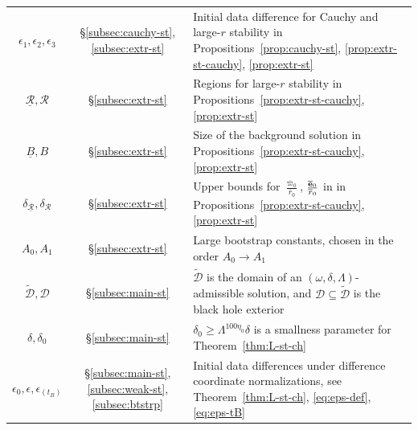 \documentclass[10pt, reqno]{amsart}
\theoremstyle{definition}
\theoremstyle{remark}
\theoremstyle{conjecture}
\numberwithin{equation}{section}
\newcommand{\0}{\emptyset}
\newcommand{\dlt}{\delta}
\newcommand{\eps}{\epsilon}
\newcommand{\Lmb}{\Lambda}
\newcommand{\omg}{\omega}
\newcommand{\bfe}{{\bf e}}
\newcommand{\calD}{\mathcal D}
\newcommand{\calR}{\mathcal R}
\newcommand{\f}{\frac}
\newcommand{\e}{\bfe}							%
\newcommand{\rbg}{\overline{r}}					%
\newcommand{\varpibg}{\overline{\varpi}}				%
\newcommand{\ebg}{\overline{\e}}					%
\begin{document}
\begin{center}
\begin{tabular}{c  c p{25em}}
$\eps_{1}, \eps_{2}, \eps_{3}$ & \S \ref{subsec:cauchy-st}, \ref{subsec:extr-st} & Initial data difference for Cauchy and large-$r$ stability in Propositions~\ref{prop:cauchy-st}, \ref{prop:extr-st-cauchy}, \ref{prop:extr-st} \\
$\underline{\calR}, \calR$ & \S \ref{subsec:extr-st} & Regions for large-$r$ stability in Propositions~\ref{prop:extr-st-cauchy}, \ref{prop:extr-st} \\
$\underline{B}, B$ & \S \ref{subsec:extr-st} & Size of the background solution in Propositions~\ref{prop:extr-st-cauchy}, \ref{prop:extr-st} \\
$\dlt_{\underline{\calR}}, \dlt_{\calR}$ & \S \ref{subsec:extr-st} & Upper bounds for $\f{\varpibg_0}{\rbg_0}$, $\f{\ebg_0}{\rbg_0}$ in in Propositions~\ref{prop:extr-st-cauchy}, \ref{prop:extr-st}\\
$A_{0}, A_{1}$ & \S \ref{subsec:extr-st} & Large bootstrap constants, chosen in the order $A_{0} \to A_{1}$ \\
$\widetilde{\calD}, \calD$ & \S \ref{subsec:main-st} & $\widetilde{\calD}$ is the domain of an $(\omg, \dlt, \Lmb)$-admissible solution, and $\calD \subseteq \widetilde{\calD}$ is the black hole exterior \\
$\dlt, \dlt_{0}$ & \S \ref{subsec:main-st} & $\dlt_{0}\geq \Lmb^{100\eta_0}\dlt$ is a smallness parameter for Theorem~\ref{thm:L-st-ch} \\
$\eps_{0}, \eps, \eps_{(t_B)}$ & \S \ref{subsec:main-st}, \ref{subsec:weak-st}, \ref{subsec:btstrp} & Initial data differences under difference coordinate normalizations, see Theorem~\ref{thm:L-st-ch}, \eqref{eq:eps-def}, \eqref{eq:eps-tB} 
\end{tabular}
\end{center}
\end{document}
